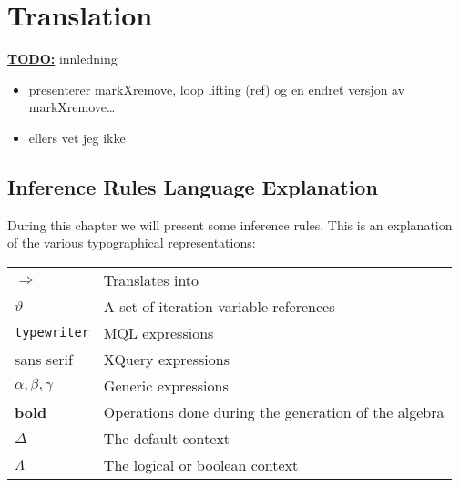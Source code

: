\chapter{Translation}


\textbf{\underline{\LARGE TODO:}} innledning
\begin{itemize}
  \item presenterer markXremove, loop lifting (ref) og en endret versjon av
  markXremove\ldots
  \item ellers vet jeg ikke
\end{itemize}


\section{Inference Rules Language Explanation}
\label{sect:translation:inferenceExplanation}
During this chapter we will present some inference rules. This is an explanation
of the various typographical representations:

\begin{tabular}{l|l}

  $\Longrightarrow$  & Translates into \\
  $\vartheta$ & A set of iteration variable references \\
  \texttt{typewriter} & MQL expressions \\
  \textsf{sans serif} & XQuery expressions \\
  $\alpha , \beta, \gamma$ & Generic expressions \\
  \textbf{bold} & Operations done during the generation of the algebra \\
  $\Delta$ & The default context \\
  $\Lambda$ & The logical or boolean context \\
  
\end{tabular}








